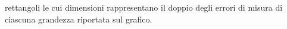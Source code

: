 rettangoli le cui dimensioni rappresentano il doppio degli errori 
di misura di ciascuna grandezza riportata sul grafico. %